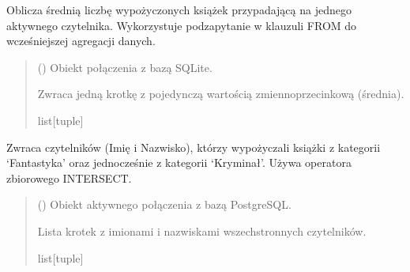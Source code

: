 \documentclass[letterpaper,10pt,english]{sphinxmanual}
\begin{document}

\begin{fulllineitems}
\label{\detokenize{rozdzial_5/index:biblioteka_zapytania.get_srednia_wypozyczen_na_czytelnika}}
\pysigstartsignatures
\pysiglinewithargsret
{}
{}
{}
\pysigstopsignatures
\sphinxAtStartPar
Oblicza średnią liczbę wypożyczonych książek przypadającą na jednego aktywnego czytelnika.
Wykorzystuje podzapytanie w klauzuli FROM do wcześniejszej agregacji danych.
\begin{quote}\begin{description}
\sphinxAtStartPar
{} () \textendash{} Obiekt połączenia z bazą SQLite.

\sphinxAtStartPar
Zwraca jedną krotkę z pojedynczą wartością zmiennoprzecinkową (średnia).

\sphinxAtStartPar
list{[}tuple{]}

\end{description}\end{quote}

\end{fulllineitems}


\begin{fulllineitems}
\label{\detokenize{rozdzial_5/index:biblioteka_zapytania.get_wszechstronni_czytelnicy}}
\pysigstartsignatures
\pysiglinewithargsret
{}
{}
{}
\pysigstopsignatures
\sphinxAtStartPar
Zwraca czytelników (Imię i Nazwisko), którzy wypożyczali książki z kategorii ‘Fantastyka’
oraz jednocześnie z kategorii ‘Kryminał’. Używa operatora zbiorowego INTERSECT.
\begin{quote}\begin{description}
\sphinxAtStartPar
{} () \textendash{} Obiekt aktywnego połączenia z bazą PostgreSQL.

\sphinxAtStartPar
Lista krotek z imionami i nazwiskami wszechstronnych czytelników.

\sphinxAtStartPar
list{[}tuple{]}

\end{description}\end{quote}

\end{fulllineitems}
\end{document}
